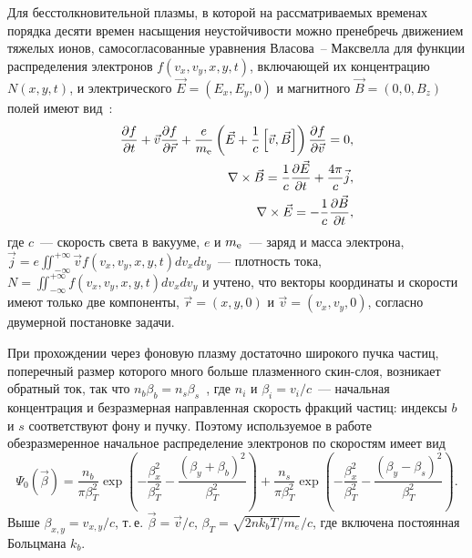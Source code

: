 Для бесстолкновительной плазмы, в которой на рассматриваемых временах порядка десяти времен насыщения неустойчивости можно пренебречь движением тяжелых ионов, самосогласованные уравнения Власова~-- Максвелла для функции распределения электронов $f(v_x , v_y , x, y, t)$, включающей их концентрацию $N (x, y, t)$, и электрического $\vec{E}=(E_x, E_y, 0)$ и магнитного $\vec{B}=(0, 0, B_z)$ полей имеют вид~\cite{Mikhailovsky1971,Krall1973,Baumjohann2012,Vedenov1963,VedenovRyutov1975,Bakunin2017,Kocharovsky2016}:
\begin{eqnarray}
    \dfrac{\partial f}{\partial t}+\vec{v}\dfrac{\partial f}{\partial \vec{r}}+\dfrac{e}{m_\mathrm{e}} \left(\vec{E}+\dfrac{1}{c}\left[\vec{v},\vec{B}\right]\right) \dfrac{\partial f}{\partial \vec{v}}=0, \\
    \label{eq:maxw1} 
    \nabla \times \vec{B}=\dfrac{1}{c}\dfrac{\partial \vec{E}}{\partial t}+\dfrac{4\pi}{c}\vec{j}, \\
    \label{eq:maxw2}
    \nabla \times \vec{E}=-\dfrac{1}{c}\dfrac{\partial \vec{B}}{\partial t},
\end{eqnarray}
где $c$~--- скорость света в вакууме, $e$ и $m_\mathrm{e}$~--- заряд и масса электрона, $\vec{j}=e\iint^{+\infty}_{-\infty}\vec{v}f(v_x , v_y , x, y, t) dv_x dv_y$~--- плотность тока, $N=\iint^{+\infty}_{-\infty}f(v_x , v_y , x, y, t)dv_xdv_y$ и учтено, что векторы координаты и скорости имеют только две компоненты, $\vec{r}=(x , y ,0)$ и $\vec{v}=(v_x , v_y ,0)$, согласно двумерной постановке задачи. 

При прохождении через фоновую плазму достаточно широкого пучка частиц, поперечный размер которого много больше плазменного скин-слоя, возникает обратный ток, так что $n_b\beta_{b}=n_s\beta_{s}$~\cite{Shukla2018,Jia2013,Karlick2008}, где $n_i$ и $\beta_i=v_i/c$~--- начальная концентрация и безразмерная направленная скорость фракций частиц: индексы $b$ и $s$ соответствуют фону и пучку. Поэтому используемое в работе обезразмеренное начальное распределение электронов по скоростям имеет вид
\begin{equation}
\label{eq:bp}
    \Psi_0(\vec{\beta})=\dfrac{n_b}{\pi\beta_T^2} \exp\left(-\dfrac{\beta_x^2}{\beta_T^2}-\dfrac{\left(\beta_y+\beta_{b}\right)^2}{\beta_T^2}\right)+\dfrac{n_s}{\pi\beta_T^2 } \exp\left(-\dfrac{\beta_x^2}{\beta_T^2}-\dfrac{\left(\beta_y-\beta_{s}\right)^2}{\beta_T^2}\right).  
\end{equation}
Выше $\beta_{x,y}={v_{x,y}}/{c}$, т.\,е. $\vec{\beta}=\vec{v}/{c}$, $\beta_T=\sqrt{2nk_bT/m_e}/c$, где включена постоянная Больцмана $k_b$. 

